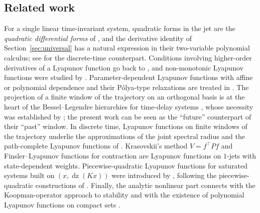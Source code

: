 \documentclass[preprint,12pt,authoryear]{elsarticle}
\theoremstyle{definition}
\theoremstyle{remark}
\newcommand{\tr}{^{\top}}
\newcommand{\dz}{\operatorname{dz}}
\begin{document}
\subsection{Related work}
For a single linear time-invariant system, quadratic forms in the jet are the \emph{quadratic differential forms} of \citet{WillemsTrentelman1998}, and the derivative identity of Section~\ref{sec:universal} has a natural expression in their two-variable polynomial calculus; see \citet{KojimaTakaba2005} for the discrete-time counterpart. Conditions involving higher-order derivatives of a Lyapunov function go back to \citet{Butz1969}, and non-monotonic Lyapunov functions were studied by \citet{AhmadiParrilo2008}. Parameter-dependent Lyapunov functions with affine or polynomial dependence and their P\'olya-type relaxations are treated in \citet{Gahinet1996,Chesi2005,OliveiraPeres2007,Scherer2005}. The projection of a finite window of the trajectory on an orthogonal basis is at the heart of the Bessel--Legendre hierarchies for time-delay systems \citep{SeuretGouaisbaut2015}, whose necessity was established by \citet{Bajodek2023}; the present work can be seen as the ``future'' counterpart of their ``past'' window. In discrete time, Lyapunov functions on finite windows of the trajectory underlie the approximations of the joint spectral radius and the path-complete Lyapunov functions of \citet{Ahmadi2014}. Krasovskii's method $V=f\tr Pf$ \citep{Krasovskii1963} and Finsler--Lyapunov functions for contraction \citep{ForniSepulchre2014,AndrieuJP2016} are Lyapunov functions on $1$-jets with state-dependent weights. Piecewise-quadratic Lyapunov functions for saturated systems built on $(x,\dz(Kx))$ were introduced by \citet{Dai2009}, following the piecewise-quadratic constructions of \citet{JohanssonRantzer1998}. Finally, the analytic nonlinear part connects with the Koopman-operator approach to stability \citep{MauroyMezic2016} and with the existence of polynomial Lyapunov functions on compact sets \citep{Peet2009}.
\end{document}
